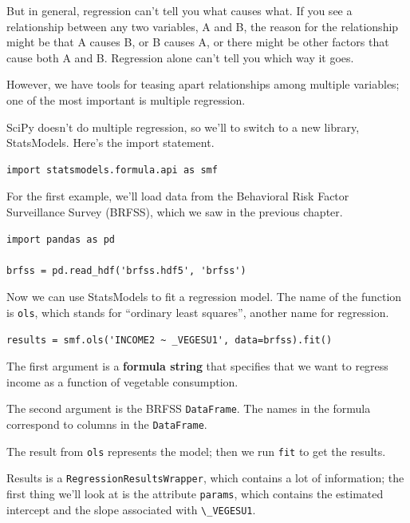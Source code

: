 But in general, regression can't tell you what causes what. If you see a
relationship between any two variables, A and B, the reason for the
relationship might be that A causes B, or B causes A, or there might be
other factors that cause both A and B. Regression alone can't tell you
which way it goes.

However, we have tools for teasing apart relationships among multiple
variables; one of the most important is multiple regression.

SciPy doesn't do multiple regression, so we'll to switch to a new
library, StatsModels. Here's the import statement.

\begin{lstlisting}[]
import statsmodels.formula.api as smf
\end{lstlisting}

For the first example, we'll load data from the Behavioral Risk Factor
Surveillance Survey (BRFSS), which we saw in the previous chapter.

\begin{lstlisting}[]
import pandas as pd

brfss = pd.read_hdf('brfss.hdf5', 'brfss')
\end{lstlisting}

Now we can use StatsModels to fit a regression model. The name of the
function is \passthrough{\lstinline!ols!}, which stands for ``ordinary
least squares'', another name for regression.

\begin{lstlisting}[]
results = smf.ols('INCOME2 ~ _VEGESU1', data=brfss).fit()
\end{lstlisting}

The first argument is a \textbf{formula string} that specifies that we
want to regress income as a function of vegetable consumption.

The second argument is the BRFSS \passthrough{\lstinline!DataFrame!}.
The names in the formula correspond to columns in the
\passthrough{\lstinline!DataFrame!}.

The result from \passthrough{\lstinline!ols!} represents the model; then
we run \passthrough{\lstinline!fit!} to get the results.

Results is a \passthrough{\lstinline!RegressionResultsWrapper!}, which
contains a lot of information; the first thing we'll look at is the
attribute \passthrough{\lstinline!params!}, which contains the estimated
intercept and the slope associated with
\passthrough{\lstinline!\_VEGESU1!}.

